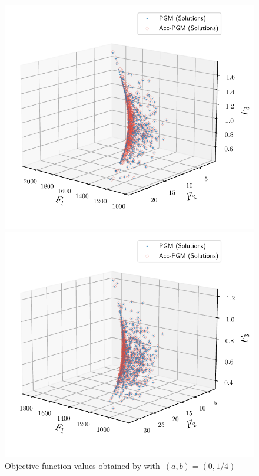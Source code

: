 \documentclass[../main]{subfiles}
\begin{document}
\begin{figure}[htbp]
\begin{minipage}[b]{.49\hsize}
    \end{minipage}
    \begin{minipage}[b]{.49\hsize}
        \centering
        \includegraphics[width=\textwidth]{figs/FDS.pdf}
    \end{minipage}
    \begin{minipage}[b]{.49\hsize}
        \centering
        \includegraphics[width=\textwidth]{figs/FDS_CONSTRAINED.pdf}
    \end{minipage}
    \caption{Objective function values obtained by  with~$(a, b) = (0, 1 / 4)$}
\end{figure}
\end{document}
